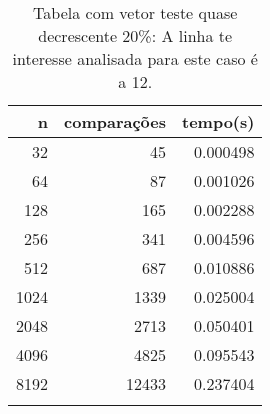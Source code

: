 \begin{table}[ht]
\centering
\begin{tabular}{rrr} \toprule
        n &    comparações &       tempo(s) \\ \midrule
      32  &             45 &      0.000498 \\
      64  &             87 &      0.001026 \\
     128  &            165 &      0.002288 \\
     256  &            341 &      0.004596 \\
     512  &            687 &      0.010886 \\
    1024  &           1339 &      0.025004 \\
    2048  &           2713 &      0.050401 \\
    4096  &           4825 &      0.095543 \\
    8192  &          12433 &      0.237404 \\
\bottomrule\addlinespace
\end{tabular}
\caption{Tabela com vetor teste quase decrescente 20\%: A linha te interesse analisada para este caso é a 12.}
\label{tab:quicksortQuaseDecresc20}
\end{table}

